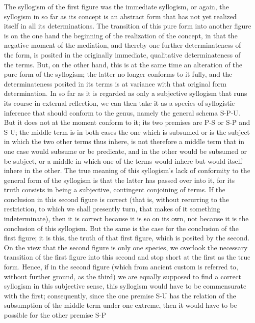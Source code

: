 The syllogism of the first figure was the immediate syllogism,
or again, the syllogism in so far as its concept is
an abstract form that has not yet realized itself
in all its determinations.
The transition of this pure form into another figure is
on the one hand the beginning of the realization of the concept,
in that the negative moment of the mediation,
and thereby one further determinateness of the form,
is posited in the originally immediate,
qualitative determinateness of the terms.
But, on the other hand, this is at the same time
an alteration of the pure form of the syllogism;
the latter no longer conforms to it fully,
and the determinateness posited in its terms is
at variance with that original form determination.
In so far as it is regarded as only a subjective syllogism
that runs its course in external reflection,
we can then take it as a species of syllogistic inference
that should conform to the genus,
namely the general schema S-P-U.
But it does not at the moment conform to it;
its two premises are P-S or S-P and S-U;
the middle term is in both cases the one which is subsumed
or is the subject in which the two other terms thus inhere,
is not therefore a middle term
that in one case would subsume or be predicate,
and in the other would be subsumed or be subject,
or a middle in which one of the terms
would inhere but would itself inhere in the other.
The true meaning of this syllogism's lack of conformity to
the general form of the syllogism is that
the latter has passed over into it,
for its truth consists in being
a subjective, contingent conjoining of terms.
If the conclusion in this second figure is correct
(that is, without recurring to the restriction,
to which we shall presently turn,
that makes of it something indeterminate),
then it is correct because it is so on its own,
not because it is the conclusion of this syllogism.
But the same is the case for the conclusion of the first figure;
it is this, the truth of that first figure,
which is posited by the second.
On the view that the second figure is only one species,
we overlook the necessary transition of
the first figure into this second
and stop short at the first as the true form.
Hence, if in the second figure
(which from ancient custom is referred to,
without further ground, as the third)
we are equally supposed to find
a correct syllogism in this subjective sense,
this syllogism would have to be commensurate with the first;
consequently, since the one premise S-U has the relation of
the subsumption of the middle term under one extreme,
then it would have to be possible for the other premise S-P

